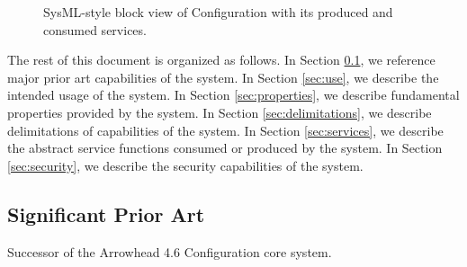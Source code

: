 \documentclass[a4paper]{arrowhead}
\begin{document}
\begin{figure}[ht!]
  \centering
  \caption{SysML-style block view of Configuration with its produced and consumed services.}
  \label{fig:system}
\end{figure}

The rest of this document is organized as follows.
In Section \ref{sec:prior_art}, we reference major prior art capabilities of the system.
In Section \ref{sec:use}, we describe the intended usage of the system.
In Section \ref{sec:properties}, we describe fundamental properties provided by the system.
In Section \ref{sec:delimitations}, we describe delimitations of capabilities of the system.
In Section \ref{sec:services}, we describe the abstract service functions consumed or produced by the system.
In Section \ref{sec:security}, we describe the security capabilities of the system.

\newpage

\subsection{Significant Prior Art}
\label{sec:prior_art}

Successor of the Arrowhead 4.6 Configuration core system.
\end{document}
